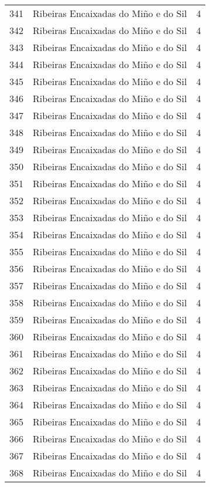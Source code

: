 \begin{table}[p]
\begin{tabular}{rlr}
  341 & Ribeiras Encaixadas do Miño e do Sil &   4 \\ 
  342 & Ribeiras Encaixadas do Miño e do Sil &   4 \\ 
  343 & Ribeiras Encaixadas do Miño e do Sil &   4 \\ 
  344 & Ribeiras Encaixadas do Miño e do Sil &   4 \\ 
  345 & Ribeiras Encaixadas do Miño e do Sil &   4 \\ 
  346 & Ribeiras Encaixadas do Miño e do Sil &   4 \\ 
  347 & Ribeiras Encaixadas do Miño e do Sil &   4 \\ 
  348 & Ribeiras Encaixadas do Miño e do Sil &   4 \\ 
  349 & Ribeiras Encaixadas do Miño e do Sil &   4 \\ 
  350 & Ribeiras Encaixadas do Miño e do Sil &   4 \\ 
  351 & Ribeiras Encaixadas do Miño e do Sil &   4 \\ 
  352 & Ribeiras Encaixadas do Miño e do Sil &   4 \\ 
  353 & Ribeiras Encaixadas do Miño e do Sil &   4 \\ 
  354 & Ribeiras Encaixadas do Miño e do Sil &   4 \\ 
  355 & Ribeiras Encaixadas do Miño e do Sil &   4 \\ 
  356 & Ribeiras Encaixadas do Miño e do Sil &   4 \\ 
  357 & Ribeiras Encaixadas do Miño e do Sil &   4 \\ 
  358 & Ribeiras Encaixadas do Miño e do Sil &   4 \\ 
  359 & Ribeiras Encaixadas do Miño e do Sil &   4 \\ 
  360 & Ribeiras Encaixadas do Miño e do Sil &   4 \\ 
  361 & Ribeiras Encaixadas do Miño e do Sil &   4 \\ 
  362 & Ribeiras Encaixadas do Miño e do Sil &   4 \\ 
  363 & Ribeiras Encaixadas do Miño e do Sil &   4 \\ 
  364 & Ribeiras Encaixadas do Miño e do Sil &   4 \\ 
  365 & Ribeiras Encaixadas do Miño e do Sil &   4 \\ 
  366 & Ribeiras Encaixadas do Miño e do Sil &   4 \\ 
  367 & Ribeiras Encaixadas do Miño e do Sil &   4 \\ 
  368 & Ribeiras Encaixadas do Miño e do Sil &   4 \\ 

\end{tabular}
\end{table}
